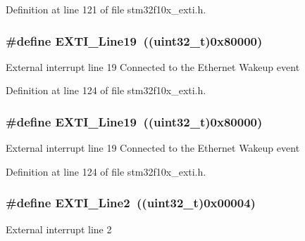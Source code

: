 Definition at line 121 of file stm32f10x\+\_\+exti.\+h.

\subsubsection[{\texorpdfstring{E\+X\+T\+I\+\_\+\+Line19}{EXTI_Line19}}]{\setlength{\rightskip}{0pt plus 5cm}\#define E\+X\+T\+I\+\_\+\+Line19~(({\bf uint32\+\_\+t})0x80000)}\hypertarget{group___e_x_t_i___lines_ga49ac0744621f88d432d85838483ad1de}{}\label{group___e_x_t_i___lines_ga49ac0744621f88d432d85838483ad1de}
External interrupt line 19 Connected to the Ethernet Wakeup event 

Definition at line 124 of file stm32f10x\+\_\+exti.\+h.

\subsubsection[{\texorpdfstring{E\+X\+T\+I\+\_\+\+Line19}{EXTI_Line19}}]{\setlength{\rightskip}{0pt plus 5cm}\#define E\+X\+T\+I\+\_\+\+Line19~(({\bf uint32\+\_\+t})0x80000)}\hypertarget{group___e_x_t_i___lines_ga49ac0744621f88d432d85838483ad1de}{}\label{group___e_x_t_i___lines_ga49ac0744621f88d432d85838483ad1de}
External interrupt line 19 Connected to the Ethernet Wakeup event 

Definition at line 124 of file stm32f10x\+\_\+exti.\+h.

\subsubsection[{\texorpdfstring{E\+X\+T\+I\+\_\+\+Line2}{EXTI_Line2}}]{\setlength{\rightskip}{0pt plus 5cm}\#define E\+X\+T\+I\+\_\+\+Line2~(({\bf uint32\+\_\+t})0x00004)}\hypertarget{group___e_x_t_i___lines_gaec4189bb2709c8c15a0339d1b0b9865a}{}\label{group___e_x_t_i___lines_gaec4189bb2709c8c15a0339d1b0b9865a}
External interrupt line 2 

